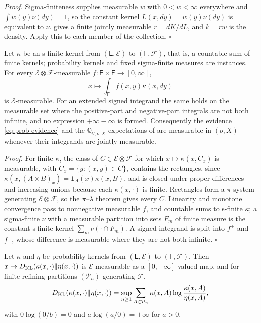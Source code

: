 \noindent\emph{Proof.}
Sigma-finiteness supplies measurable $w$ with $0<w<\infty$ everywhere and $\int w(y)\nu(dy)=1$, so the constant
kernel $L(x,dy)=w(y)\nu(dy)$ is equivalent to $\nu$.  gives a finite
jointly measurable $r=dK/dL$, and $k=rw$ is the density. Apply this to each member of the collection.
\hfill$\square$

Let $\kappa$ be an s-finite kernel from $(\mathsf E,\mathscr E)$ to $(\mathsf F,\mathscr F)$, that is, a
countable sum of finite kernels; probability kernels and fixed sigma-finite measures are instances. For
every $\mathscr E\otimes\mathscr F$-measurable $f:\mathsf E\times\mathsf F\to[0,\infty]$,
\label{prop:prob-sigmafinite-integration-measurability}
\begin{equation}
x\longmapsto\int_{\mathsf F}f(x,y)\kappa(x,dy)
\label{eq:prob-kernel-integration}
\end{equation}
is $\mathscr E$-measurable. For an extended signed integrand the same holds on the measurable set where the
positive-part and negative-part integrals are not both infinite, and no expression $+\infty-\infty$ is formed.
Consequently the evidence \eqref{eq:prob-evidence} and the $\mathbb Q_{V,o,X}$-expectations of 
are measurable in $(o,X)$ whenever their integrands are jointly measurable. 

\noindent\emph{Proof.}
For finite $\kappa$, the class of $C\in\mathscr E\otimes\mathscr F$ for which $x\mapsto\kappa(x,C_x)$ is
measurable, with $C_x=\{y:(x,y)\in C\}$, contains the rectangles, since
$\kappa(x,(A\times B)_x)=\mathbf 1_A(x)\kappa(x,B)$, and is closed under proper differences and increasing
unions because each $\kappa(x,\cdot)$ is finite. Rectangles form a $\pi$-system generating
$\mathscr E\otimes\mathscr F$, so the $\pi$--$\lambda$ theorem gives every $C$. Linearity and monotone
convergence pass to nonnegative measurable $f$, and countable sums to s-finite $\kappa$; a sigma-finite $\nu$
with a measurable partition into sets $F_m$ of finite measure is the constant s-finite kernel
$\sum_m\nu(\cdot\cap F_m)$. A signed integrand is split into $f^+$ and $f^-$, whose difference is measurable
where they are not both infinite. \hfill$\square$

Let $\kappa$ and $\eta$ be probability kernels from $(\mathsf E,\mathscr E)$ to $(\mathsf F,\mathscr F)$. Then
$x\mapsto D_{\mathrm{KL}}(\kappa(x,\cdot)\Vert\eta(x,\cdot))$ is $\mathscr E$-measurable as a $[0,+\infty]$-valued map, and
for finite refining partitions $(\mathcal P_n)$ generating $\mathscr F$,
\begin{equation}
D_{\mathrm{KL}}(\kappa(x,\cdot)\Vert\eta(x,\cdot))
=\sup_{n\geq1}\sum_{A\in\mathcal P_n}\kappa(x,A)\log\frac{\kappa(x,A)}{\eta(x,A)},
\label{eq:prob-kernel-kl-partitions}
\end{equation}
with $0\log(0/b)=0$ and $a\log(a/0)=+\infty$ for $a>0$. 

